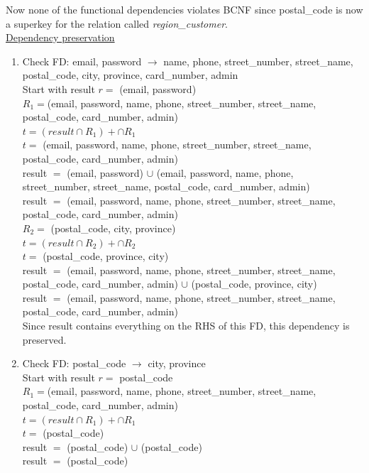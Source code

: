 \documentclass[a4 paper]{article}
\begin{document}
\noindent Now none of the functional dependencies violates BCNF since postal\_code is now a superkey for the relation called 
\emph{region\_customer}.\\

\noindent\underline{Dependency preservation}\\

\begin{enumerate}
	\item Check FD: email, password  $\rightarrow$ name, phone, street\_number, street\_name, postal\_code, city, province, card\_number, admin\\
	Start with result $r =$ (email, password)\\
	
	$R_{1} = $(email, password, name, phone, street\_number, street\_name, postal\_code, card\_number, admin)\\
	$t = (result \cap R_{1})+ \cap R_{1}$\\
	$t =$ (email, password, name, phone, street\_number, street\_name, postal\_code, card\_number, admin)\\
	result $=$ (email, password) $\cup$ (email, password, name, phone, street\_number, street\_name, postal\_code, card\_number, admin)\\
	result $=$ (email, password, name, phone, street\_number, street\_name, postal\_code, card\_number, admin)\\
	
	$R_{2} =$ (postal\_code, city, province)\\
	$t = (result \cap R_{2})+ \cap R_{2}$\\
	$t =$ (postal\_code, province, city)\\
	result $=$ (email, password, name, phone, street\_number, street\_name, postal\_code, card\_number, admin) $\cup$ (postal\_code, province, city)\\
	result $=$ (email, password, name, phone, street\_number, street\_name, postal\_code, card\_number, admin)\\
	
	Since result contains everything on the RHS of this FD, this dependency is preserved.

	\item Check FD: postal\_code $\rightarrow$ city, province\\
	Start with result $r =$ postal\_code\\
	
	$R_{1} = $(email, password, name, phone, street\_number, street\_name, postal\_code, card\_number, admin)\\
	$t = (result \cap R_{1})+ \cap R_{1}$\\
	$t =$ (postal\_code)\\
	result $=$ (postal\_code) $\cup$ (postal\_code)\\
	result $=$ (postal\_code)\\
	

\end{enumerate}
\end{document}
